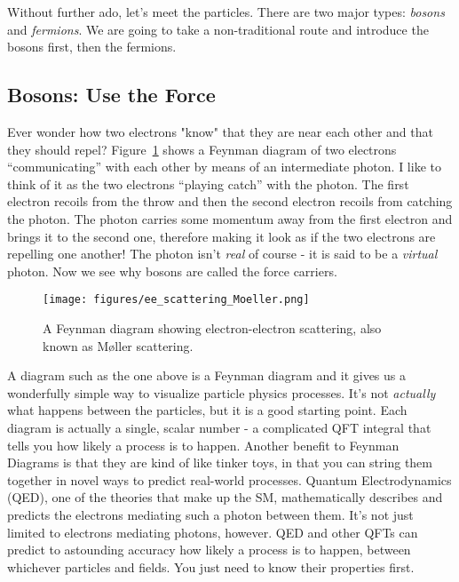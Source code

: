 Without further ado, let's meet the particles.
There are two major types: \emph{bosons} and \emph{fermions}.
We are going to take a non-traditional route and introduce the bosons first, then the fermions.

\subsection{Bosons: Use the Force}
Ever wonder how two electrons "know" that they are near each other and that they should repel? 
Figure~\ref{fig:ee_scattering} shows a Feynman diagram of two electrons ``communicating'' with each other by means of an intermediate photon.
I like to think of it as the two electrons ``playing catch'' with the photon.
The first electron recoils from the throw and then the second electron recoils from catching the photon.
The photon carries some momentum away from the first electron and brings it to the second one, therefore making it look as if the two electrons are repelling one another!
The photon isn't \emph{real} of course - it is said to be a \emph{virtual} photon.
Now we see why bosons are called the force carriers.
\begin{figure}[pbth]
\centering
\texttt{[image: figures/ee\_scattering\_Moeller.png]}
    \caption{A Feynman diagram showing electron-electron scattering, also known as Møller scattering.} 
    \label{fig:ee_scattering}
\end{figure}

A diagram such as the one above is a Feynman diagram and it gives us a wonderfully simple way to visualize particle physics processes.
It's not \emph{actually} what happens between the particles, but it is a good starting point.
Each diagram is actually a single, scalar number -
a complicated QFT integral that tells you how likely a process is to happen.
Another benefit to Feynman Diagrams is that they are kind of like tinker toys, 
in that you can string them together in novel ways to predict real-world processes.
Quantum Electrodynamics (QED), one of the theories that make up the SM, mathematically describes and predicts the electrons mediating such a photon between them. 
It's not just limited to electrons mediating photons, however.
QED and other QFTs can predict to astounding accuracy how likely a process is to happen, between whichever particles and fields. 
You just need to know their properties first.

